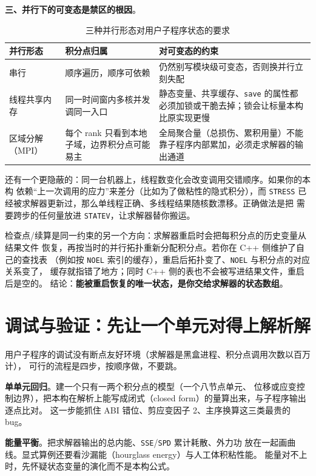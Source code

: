 \documentclass[12pt,a4paper,fontset=fandol]{ctexbook}
\newcommand{\Tp}[1]{\texttt{#1}}
\newcommand{\Bk}{\discretionary{}{}{}}
\newcommand{\Lang}[1]{\textsf{#1}}
\newcommand{\CPP}{\Lang{C++}}
\begin{document}
\textbf{三、并行下的可变态是禁区的根因}。

\begin{table}[htbp]
\centering
\caption{三种并行形态对用户子程序状态的要求}
\label{tab:ch05-parallel}
\begin{tabular}{>{\raggedright\arraybackslash}p{}>{\raggedright\arraybackslash}p{}>{\raggedright\arraybackslash}p{}}
\toprule
并行形态 & 积分点归属 & 对可变态的约束 \\
\midrule
串行 & 顺序遍历，顺序可依赖 & 仍然别写模块级可变态，否则换并行立刻失配 \\
线程共享内存 & 同一时间窗内多核并发调同一入口 & 静态变量、共享缓存、\Tp{save} 的属性都必须加锁或干脆去掉；锁会让标量本构比原实现更慢 \\
区域分解（MPI） & 每个 rank 只看到本地子域，边界积分点可能易主 & 全局聚合量（总损伤、累积用量）不能靠子程序内部累加，必须走求解器的输出通道 \\
\bottomrule
\end{tabular}
\end{table}

还有一个更隐蔽的：同一台机器上，线程数变化会改变调用交错顺序。如果你的本构
依赖``上一次调用的应力''来差分（比如为了做粘性的隐式积分），而 \Tp{STRESS}
已经被求解器更新过，那么单线程正确、多线程结果随核数漂移。正确做法是把
需要跨步的任何量放进 \Tp{STATEV}，让求解器替你搬运。

检查点/续算是同一约束的另一个方向：求解器重启时会把每积分点的历史变量从结果文件
恢复，再按当时的并行拓扑重新分配积分点。若你在 \CPP{} 侧维护了自己的查找表
（例如按 \Tp{NOEL} 索引的缓存），重启后拓扑变了、\Tp{NOEL} 与积分点的对应关系变了，
缓存就指错了地方；同时 \CPP{} 侧的表也不会被写进结果文件，重启后是空的。
结论：\textbf{能被重启恢复的唯一状态，是你交给求解器的状态数组}。

\section{调试与验证：先让一个单元对得上解析解}
\label{sec:ch05-verify}

用户子程序的调试没有断点友好环境（求解器是黑盒进程、积分点调用次数以百万计），
可行的流程是四步，按顺序做，不要跳。

\textbf{单单元回归}。建一个只有一两个积分点的模型（一个八节点单元、
位移或应变控制边界），把本构在解析上能写成闭式（closed form）的量算出来，与子程序输出逐点比对。
这一步能抓住 ABI 错位、剪应变因子 2、主序换算这三类最贵的 bug。

\textbf{能量平衡}。把求解器输出的总内能、\Tp{SSE}/{\Bk}\Tp{SPD} 累计耗散、外力功
放在一起画曲线。显式算例还要看沙漏能（hourglass energy）与人工体积粘性能。
能量对不上时，先怀疑状态变量的演化而不是本构公式。
\end{document}
